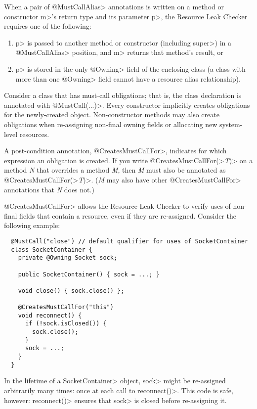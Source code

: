 When a pair of \<@MustCallAlias> annotations is written on a method or constructor \<m>'s return type
and its parameter \<p>, the Resource Leak Checker requires one of the following:
\begin{enumerate}
\item \<p> is passed to another method or constructor (including \<super>) in a
  \<@MustCallAlias> position, and \<m> returns that method's result, or
\item \<p> is stored in the only \<@Owning> field of the enclosing class (a class with more than one
  \<@Owning> field cannot have a resource alias relationship).
\end{enumerate}



Consider a class that has must-call obligations; that is, the class
declaration is annotated with \<@MustCall(...)>.
Every constructor implicitly creates obligations for the newly-created object.
Non-constructor methods may also create obligations
when re-assigning non-final owning fields or allocating
new system-level resources.

A post-condition annotation,
\<@CreatesMustCallFor>,
indicates for which expression an obligation is created.
If you write \<@CreatesMustCallFor(>\emph{T}\<)> on a method \emph{N} that
overrides a method \emph{M}, then \emph{M} must also be annotated as
\<@CreatesMustCallFor(>\emph{T}\<)>.  (\emph{M} may also have other
\<@CreatesMustCallFor> annotations that \emph{N} does not.)

\<@CreatesMustCallFor> allows the Resource Leak Checker to verify uses of non-final fields
that contain a resource, even if they are re-assigned. Consider
the following example:

\begin{verbatim}
  @MustCall("close") // default qualifier for uses of SocketContainer
  class SocketContainer {
    private @Owning Socket sock;

    public SocketContainer() { sock = ...; }

    void close() { sock.close() };

    @CreatesMustCallFor("this")
    void reconnect() {
      if (!sock.isClosed()) {
        sock.close();
      }
      sock = ...;
    }
  }
\end{verbatim}

In the lifetime of a \<SocketContainer> object, \<sock>
might be re-assigned arbitrarily many times: once at each
call to \<reconnect()>. This code is safe, however: \<reconnect()>
ensures that \<sock> is closed before re-assigning it.

